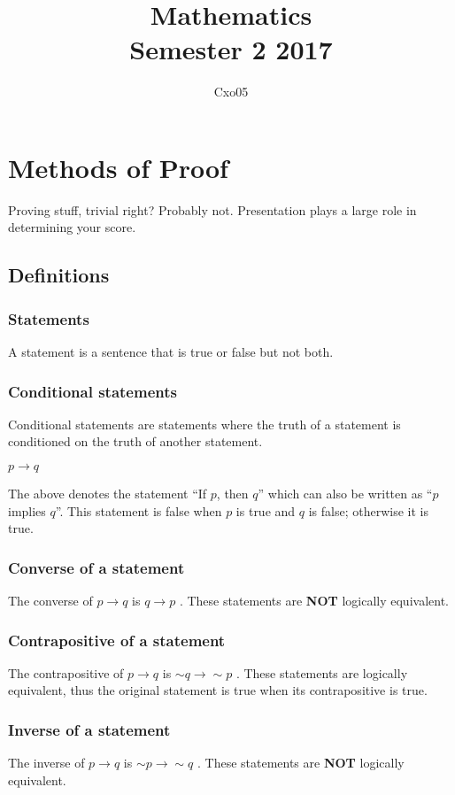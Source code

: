 \documentclass[10pt,a4paper]{article}
\begin{document}
\title{
Mathematics \\
\large Semester 2 2017
}
\author{Cxo05}

\maketitle
\section{Methods of Proof}
Proving stuff, trivial right? Probably not. Presentation plays a large role in determining your score.

\subsection{Definitions}
\subsubsection{Statements}
A statement is a sentence that is true or false but not both.
\subsubsection{Conditional statements}
Conditional statements are statements where the truth of a statement is conditioned on the truth of another statement.
\begin{center}
$p \rightarrow q$
\end{center}
The above denotes the statement ``If $p$, then $q$'' which can also be written as ``$p$ implies $q$''. This statement is false when $p$ is true and $q$ is false; otherwise it is true.
\subsubsection{Converse of a statement}
The converse of $p \rightarrow q$ is $q
\rightarrow p$ . These statements are \textbf{NOT} logically equivalent. 
\subsubsection{Contrapositive of a statement}
The contrapositive of $p \rightarrow q$ is $\sim q \rightarrow \sim p$ . These statements are logically equivalent, thus the original statement is true when its contrapositive is true.
\subsubsection{Inverse of a statement}
The inverse of $p \rightarrow q$ is $\sim p \rightarrow \sim q$ . These statements are \textbf{NOT} logically equivalent. 
\end{document}
